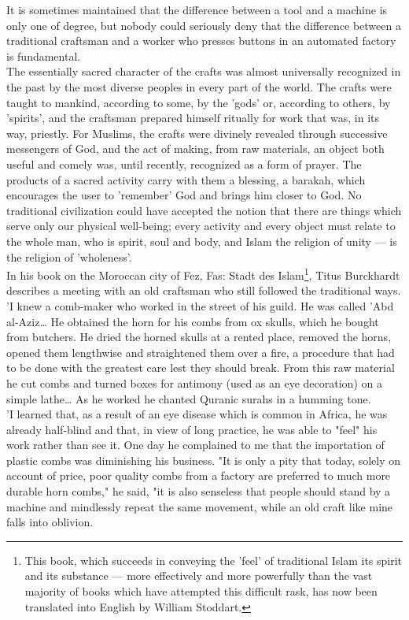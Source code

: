 \documentclass[11pt, b5paper, twoside]{book}
\begin{document}
It is sometimes maintained that the difference between a tool and a machine is only one of degree, 
but nobody could seriously deny that the difference between a traditional craftsman and a worker who 
presses buttons in an automated factory is fundamental. \\

The essentially sacred character of the crafts was almost universally recognized in the past by the 
most diverse peoples in every part of the world. The crafts were taught to mankind, according to 
some, by the 'gods' or, according to others, by 'spirits', and the craftsman prepared himself 
ritually for work that was, in its way, priestly. For Muslims, the crafts were divinely revealed 
through successive messengers of God, and the act of making, from raw materials, an object both 
useful and comely was, until recently, recognized as a form of prayer. The products of a sacred 
activity carry with them a blessing, a barakah, which encourages the user to 'remember' God and 
brings him closer to God. No traditional civilization could have accepted the notion that there are 
things which serve only our physical well-being; every activity and every object must relate to the 
whole man, who is spirit, soul and body, and Islam the religion of unity --- is the religion of 
'wholeness'. \\

In his book on the Moroccan city of Fez, Fas: Stadt des Islam\footnote{This book, which succeeds in conveying the 'feel' of traditional Islam its spirit and its substance --- more effectively and more powerfully than the vast majority of books which have attempted this 
difficult rask, has now been translated into English by William Stoddart.}, Titus Burckhardt describes a 
meeting with an old craftsman who still followed the traditional ways. 'I knew a comb-maker who 
worked in the street of his guild. He was called 'Abd al-Aziz\ldots{} He obtained the horn for his combs 
from ox skulls, which he bought from butchers. He dried the horned skulls at a rented place, removed 
the horns, opened them lengthwise and straightened them over a fire, a procedure that had to be done 
with the greatest care lest they should break. From this raw material he cut combs and turned boxes 
for antimony (used as an eye decoration) on a simple lathe\ldots{} As he worked he chanted Quranic surahs in a humming tone. \\

'I learned that, as a result of an eye disease which is common in Africa, he was already half-blind 
and that, in view of long practice, he was able to "feel" his work rather than see it. One day he 
complained to me that the importation of plastic combs was diminishing his business. "It is only a 
pity that today, solely on account of price, poor quality combs from a factory are preferred to much 
more durable horn combs," he said, "it is also senseless that people should stand by a machine and 
mindlessly repeat the same movement, while an old craft like mine falls into oblivion. \\
\end{document}
